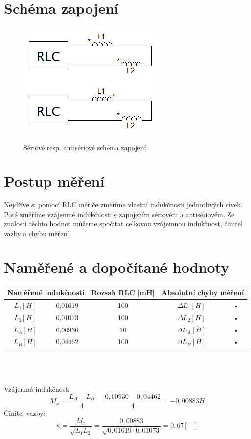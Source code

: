 \documentclass[12pt]{article} %
\begin{document}
\section{Schéma zapojení}
\begin{figure}[H]
\center
\includegraphics[scale=1]{schema1.png}
\includegraphics[scale=1]{schema2.png}
\caption{Sériové resp. antisériové schéma zapojení}
\end{figure}

\section{Postup měření}
Nejdříve si pomocí RLC měřiče změříme vlastní indukčnosti jednotlivých cívek. Poté změříme vzájemné indukčnosti s zapojením sériovém a antisériovém. Ze znalosti těchto hodnot můžeme spočítat celkovou vzájemnou indukčnost, činitel vazby a chybu měření.

\section{Naměřené a dopočítané hodnoty}
\begin{tabular}{|c|c|c|c|c|}
\hline 
\multicolumn{2}{|c|}{Naměřené indukčnosti} & Rozsah RLC [mH] & \multicolumn{2}{|c|}{Absolutní chyby měření} \\ 
\hline 
$L_1[H]$ & 0,01619 & 100 & $\Delta L_1[H]$ & • \\ 
\hline 
$L_2[H]$ & 0,01073 & 100 & $\Delta L_2[H]$ & • \\ 
\hline 
$L_A[H]$ & 0,00930 & 10 & $\Delta L_A[H]$ & • \\ 
\hline
$L_B[H]$ & 0,04462 & 100 & $\Delta L_B[H]$ & • \\ 
\hline 
\end{tabular} \\\\\\
Vzájemná indukčnost:
\begin{equation}
M_x = \frac{L_A-L_B}{4} = \frac{0,00930-0,04462}{4} = -0,00883 H
\end{equation}
Činitel vazby:
\begin{equation}
\kappa = \frac{|M_x|}{\sqrt{L_1L_2}} = \frac{0,00883}{\sqrt{0,01619\cdot 0,01073}} = 0,67 [-]
\end{equation}
\end{document}
